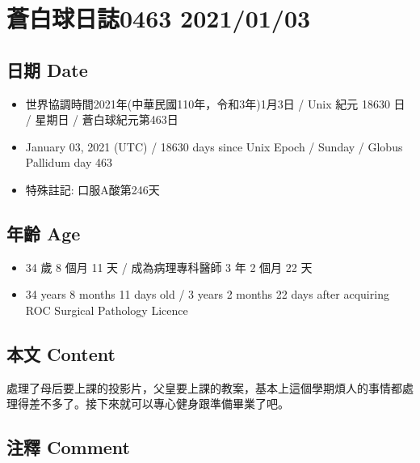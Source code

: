 \documentclass[
]{article}
\providecommand{\tightlist}{%
  \setlength{\itemsep}{0pt}\setlength{\parskip}{0pt}}
\begin{document}
\hypertarget{ux84bcux767dux7403ux65e5ux8a8c0463-20210103}{%
\section{蒼白球日誌0463
2021/01/03}\label{ux84bcux767dux7403ux65e5ux8a8c0463-20210103}}

\hypertarget{ux65e5ux671f-date-2}{%
\subsection{日期 Date}\label{ux65e5ux671f-date-2}}

\begin{itemize}
\tightlist
\item
  世界協調時間2021年(中華民國110年，令和3年)1月3日 / Unix 紀元 18630 日
  / 星期日 / 蒼白球紀元第463日
\item
  January 03, 2021 (UTC) / 18630 days since Unix Epoch / Sunday / Globus
  Pallidum day 463
\item
  特殊註記: 口服A酸第246天
\end{itemize}

\hypertarget{ux5e74ux9f61-age-2}{%
\subsection{年齡 Age}\label{ux5e74ux9f61-age-2}}

\begin{itemize}
\tightlist
\item
  34 歲 8 個月 11 天 / 成為病理專科醫師 3 年 2 個月 22 天
\item
  34 years 8 months 11 days old / 3 years 2 months 22 days after
  acquiring ROC Surgical Pathology Licence
\end{itemize}

\hypertarget{ux672cux6587-content-2}{%
\subsection{本文 Content}\label{ux672cux6587-content-2}}

處理了母后要上課的投影片，父皇要上課的教案，基本上這個學期煩人的事情都處理得差不多了。接下來就可以專心健身跟準備畢業了吧。

\hypertarget{ux6ce8ux91cb-comment-2}{%
\subsection{注釋 Comment}\label{ux6ce8ux91cb-comment-2}}
\end{document}
